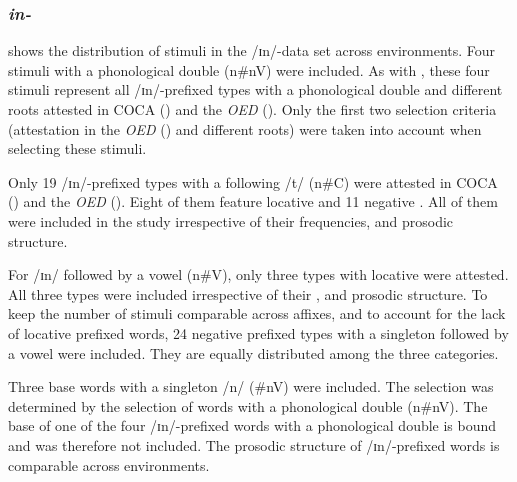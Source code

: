 \subsubsection{\textit{in-}}

 shows the distribution of  stimuli in the /ɪn/-data set across environments. 
Four stimuli with a phonological double ({n\#nV}) were included. As with , these four stimuli represent all /ɪn/-prefixed types with a phonological double and different roots attested in  {COCA} (\citealt{Davies.20082014}) and the \textit{OED} (\citealt{OED.2013}). Only the first two selection criteria (attestation in the \textit{OED} (\citealt{OED.2013}) and different roots) were taken into account when selecting these stimuli. 



Only 19 /ɪn/-prefixed types with a following /t/ ({n\#C}) were attested  in  {COCA} (\citealt{Davies.20082014}) and the \textit{OED} (\citealt{OED.2013}).  Eight of them feature locative  and 11 negative . All of them were included in the study irrespective of their frequencies,  and prosodic structure. 

For /ɪn/ followed by a vowel ({n\#V}), only three types with locative  were attested. All three types were included irrespective of their ,  and prosodic structure. 
To keep the number of stimuli comparable across affixes, and to account for the lack of locative prefixed words, 24 negative prefixed types with a singleton followed by a vowel were included. They are equally distributed among the three  categories.  



Three base words with a singleton /n/ ({\#nV}) were included. The selection was determined by the selection of words with a phonological double ({n\#nV}). The base of one of the four /ɪn/-prefixed words with a phonological double is bound and was therefore not included. 
The prosodic structure of /ɪn/-prefixed words is comparable across environments.


